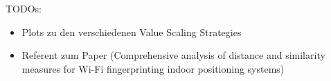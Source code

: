 TODOs:

\begin{itemize}
    \item Plots zu den verschiedenen Value Scaling Strategies
    \item Referent zum Paper (Comprehensive analysis of distance and similarity measures for Wi-Fi fingerprinting indoor positioning systems)
\end{itemize}  
